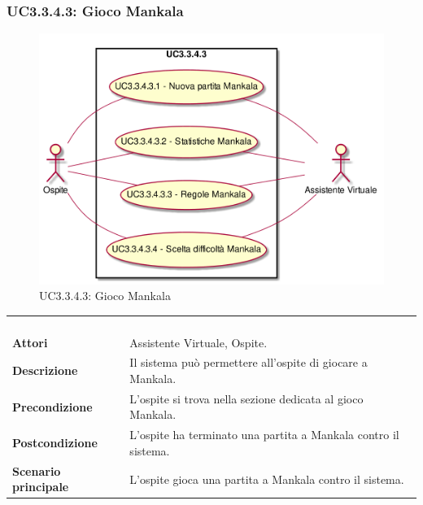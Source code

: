 \newpage\subsubsection{UC3.3.4.3: Gioco Mankala}
\label{UC3.3.4.3}
\begin{figure}[h]
\centering
\includegraphics[width=\textwidth,height=\textheight,keepaspectratio]{images/UseCaseUC3343.png}
\caption{UC3.3.4.3: Gioco Mankala}
\end{figure}
\begin{longtable}{l|p{10cm}}
\rowcolor[gray]{0.8} \multicolumn{2}{c}{} \\
\rowcolor[gray]{0.8} \multicolumn{2}{c}{\textbf{UC3.3.4.3 - Gioco Mankala}} \\
\rowcolor[gray]{0.8} \multicolumn{2}{c}{} \\
\hline
&\\
\textbf{Attori} & Assistente Virtuale, Ospite.\\[7pt]
\textbf{Descrizione} & Il sistema può permettere all'ospite di giocare a Mankala.\\[7pt]
\textbf{Precondizione} & L'ospite si trova nella sezione dedicata al gioco Mankala.\\[7pt]
\textbf{Postcondizione} & L'ospite ha terminato una partita a Mankala contro il sistema.\\[7pt]
\textbf{Scenario principale} &L'ospite gioca una partita a Mankala contro il sistema.\\[7pt]\hline
\end{longtable}

